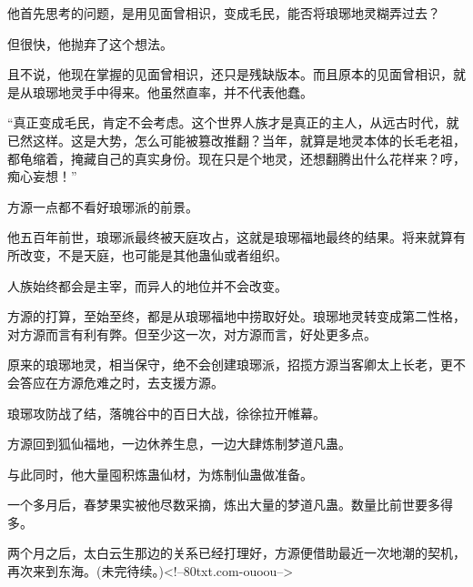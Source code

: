 \begin{this_body}
他首先思考的问题，是用见面曾相识，变成毛民，能否将琅琊地灵糊弄过去？

但很快，他抛弃了这个想法。

且不说，他现在掌握的见面曾相识，还只是残缺版本。而且原本的见面曾相识，就是从琅琊地灵手中得来。他虽然直率，并不代表他蠢。

“真正变成毛民，肯定不会考虑。这个世界人族才是真正的主人，从远古时代，就已然这样。这是大势，怎么可能被篡改推翻？当年，就算是地灵本体的长毛老祖，都龟缩着，掩藏自己的真实身份。现在只是个地灵，还想翻腾出什么花样来？哼，痴心妄想！”

方源一点都不看好琅琊派的前景。

他五百年前世，琅琊派最终被天庭攻占，这就是琅琊福地最终的结果。将来就算有所改变，不是天庭，也可能是其他蛊仙或者组织。

人族始终都会是主宰，而异人的地位并不会改变。

方源的打算，至始至终，都是从琅琊福地中捞取好处。琅琊地灵转变成第二性格，对方源而言有利有弊。但至少这一次，对方源而言，好处更多点。

原来的琅琊地灵，相当保守，绝不会创建琅琊派，招揽方源当客卿太上长老，更不会答应在方源危难之时，去支援方源。

琅琊攻防战了结，落魄谷中的百日大战，徐徐拉开帷幕。

方源回到狐仙福地，一边休养生息，一边大肆炼制梦道凡蛊。

与此同时，他大量囤积炼蛊仙材，为炼制仙蛊做准备。

一个多月后，春梦果实被他尽数采摘，炼出大量的梦道凡蛊。数量比前世要多得多。

两个月之后，太白云生那边的关系已经打理好，方源便借助最近一次地潮的契机，再次来到东海。(未完待续。)<!--80txt.com-ouoou-->

\end{this_body}

